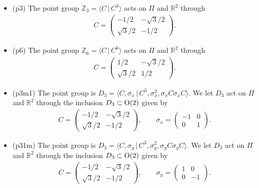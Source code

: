 \documentclass[pdftex]{sigma}
\theoremstyle{definition}
\newcommand{\R}{\mathbb{R}}
\newcommand{\Z}{\mathbb{Z}}
\begin{document}
\begin{itemize}\itemsep=0pt
\item
(\textsf{p3})
The point group $\Z_3 = \langle C \,|\, C^3 \rangle$ acts on $\Pi$ and $\R^2$ through
\begin{gather*}
C =
\left(
\begin{matrix}
-1/2 & -\sqrt{3}/2 \\
\sqrt{3}/2 & -1/2
\end{matrix}
\right).
\end{gather*}

\item
(\textsf{p6})
The point group $\Z_6 = \langle C \,|\, C^6 \rangle$ acts on $\Pi$ and $\R^2$ through
\begin{gather*}
C =
\left(
\begin{matrix}
1/2 & -\sqrt{3}/2 \\
\sqrt{3}/2 & 1/2
\end{matrix}
\right).
\end{gather*}

\item
(\textsf{p3m1})
The point group is $D_3 = \langle C, \sigma_x \,|\, C^3, \sigma_x^2, \sigma_xC\sigma_xC \rangle$. We let $D_3$ act on $\Pi$ and $\R^2$ through the inclusion $D_3 \subset {\rm O}(2)$ given by
\begin{gather*}
C =
\left(
\begin{matrix}
-1/2 & -\sqrt{3}/2 \\
\sqrt{3}/2 & -1/2
\end{matrix}
\right), \qquad
\sigma_x =
\left(
\begin{matrix}
-1 & 0 \\
0 & 1
\end{matrix}
\right).
\end{gather*}

\item
(\textsf{p31m})
The point group is $D_3 = \langle C, \sigma_y \,|\, C^3, \sigma_y^2, \sigma_yC\sigma_yC \rangle$. We let $D_3$ act on $\Pi$ and $\R^2$ through the inclusion $D_3 \subset {\rm O}(2)$ given by
\begin{gather*}
C =
\left(
\begin{matrix}
-1/2 & -\sqrt{3}/2 \\
\sqrt{3}/2 & -1/2
\end{matrix}
\right), \qquad
\sigma_y =
\left(
\begin{matrix}
1 & 0 \\
0 & -1
\end{matrix}
\right).
\end{gather*}


\end{itemize}
\end{document}
